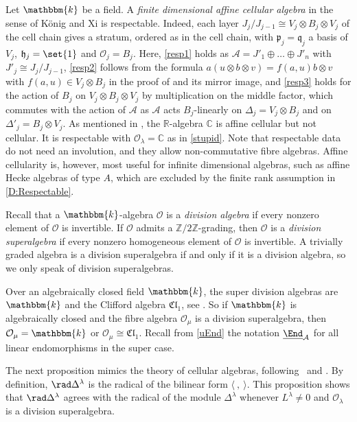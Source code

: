 \documentclass[a4paper,11pt]{amsart}
\newcommand{\uEnd}{\underline{\End}}
\let\<\langle
\let\>\rangle
\numberwithin{equation}{subsection}
\theoremstyle{definition}
\theoremstyle{theorem}
\theoremstyle{remark}
\newcommand\CA{\mathcal{A}}
\newcommand\CO{\mathcal{O}}
\newcommand\plam[1][\lambda]{\mathfrak{p}_{#1}}
\newcommand\hlam[1][\lambda]{\mathfrak{h}_{#1}}
\newcommand\qlam[1][\lambda]{\mathfrak{q}_{#1}}
\newcommand\Olam[1][\lambda]{\CO_{#1}}
\newcommand\kk{\mathbbm{k}}
\newcommand\Z{\mathbb{Z}}
\begin{document}
\begin{Example}\label{R:KoenigXi}
  Let $\kk$ be a field.  A \emph{finite dimensional affine cellular
  algebra} in the sense of K\"onig and Xi
  \cite[Definition~2.1]{KoenigXi:AffineCellular} is respectable. Indeed,
  each layer $J_j/J_{j-1}\cong V_j\otimes B_j\otimes V_j$ of the cell
  chain gives a stratum, ordered as in the cell chain, with
  $\plam[j]=\qlam[j]$ a basis of $V_j$, $\hlam[j]=\set{1}$ and
  $\Olam[j]=B_j$. Here,  \autoref{resp1} holds as
  $\CA=J'_1\oplus\dots\oplus J'_n$ with $J'_j\cong J_j/J_{j-1}$,
  \autoref{resp2} follows from the formula $a(u\otimes b\otimes
  v)=f(a,u)b\otimes v$ with $f(a,u)\in V_j\otimes B_j$ in the proof of
  \cite[Proposition~2.2]{KoenigXi:AffineCellular} and its mirror image,
  and \autoref{resp3} holds for the action of $B_j$ on $V_j\otimes
  B_j\otimes V_j$ by multiplication on the middle factor, which commutes
  with the action of $\CA$ as $\CA$ acts $B_j$-linearly on
  $\Delta_j=V_j\otimes B_j$ and on $\Delta'_j=B_j\otimes V_j$. As
  mentioned in \cite[Section~2.1]{KoenigXi:AffineCellular}, the $\mathbb
  R$-algebra $\mathbb C$ is affine cellular but not cellular. It is
  respectable with $\Olam=\mathbb C$ as in \autoref{stupid}. Note that
  respectable data do not need an involution, and they allow
  non-commutative fibre algebras. Affine cellularity is, however, most useful for infinite dimensional algebras, such as affine Hecke algebras of type $A$, which are excluded by the finite rank assumption in \autoref{D:Respectable}.
\end{Example}


 Recall that a $\kk$-algebra $\CO$ is a \emph{division algebra} if every
 nonzero element of $\CO$ is invertible. If $\CO$ admits a
 $\Z/2\Z$-grading, then $\CO$ is a \emph{division superalgebra} if every
 nonzero homogeneous element of $\CO$ is invertible. A trivially graded
 algebra is a division superalgebra if and only if it is a division
 algebra, so we only speak of division superalgebras.

Over an algebraically closed field $\kk$, the super division algebras
are $\kk$ and the Clifford algebra $\mathfrak{Cl}_1$, see
\cite{Jozefiak}.  So if $\kk$ is algebraically closed and the fibre
algebra $\Olam[\mu]$ is a division superalgebra, then $\Olam[\mu]=\kk$
or $\Olam[\mu]\cong\mathfrak{Cl}_1$. Recall from \autoref{uEnd} the
notation $\uEnd_{\CA}$ for all linear endomorphisms  in the super case.

The next proposition mimics the theory of cellular algebras,
following~\cite{GrahamLehrer:Cellular} and
\cite[Chapter~2]{Mathas:ULect}.  By definition, $\rad\Delta^\lambda$ is
the radical of the bilinear form $\<\ ,\ \>$. This proposition shows
that $\rad\Delta^\lambda$ agrees with the radical of the module
$\Delta^\lambda$ whenever $L^\lambda\ne0$ and $\Olam$ is a division
superalgebra.
\end{document}
